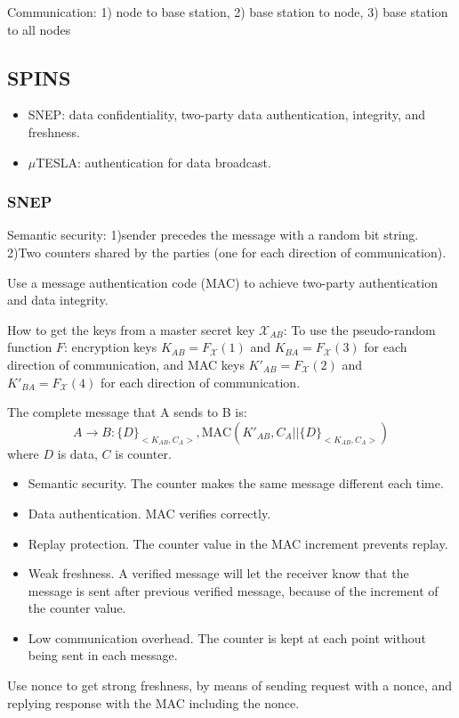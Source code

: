 \documentclass[]{article}
\begin{document}
 Communication: 1) node to base station, 2) base station to node, 3) 
 base station to all nodes
\subsection{SPINS}
\begin{itemize}
 \item SNEP: data confidentiality, two-party data authentication, integrity,
 and freshness.
 \item $\mu$TESLA: authentication for data broadcast.
\end{itemize}

\subsubsection{SNEP}
Semantic security: 1)sender precedes the message with a random bit string.
2)Two counters shared by the parties (one for each direction of
 communication). 
 
 Use a message authentication code (MAC) to achieve two-party authentication
 and data integrity.
 
 How to get the keys from a master secret key $\mathcal{X}_{AB}$: To use
 the pseudo-random function $F$: encryption keys $K_{AB} = F_\mathcal{X}
 (1)$ and $K_{BA} = F_\mathcal{X}(3)$ for each direction of communication, 
 and MAC keys $K'_{AB} = F_\mathcal{X} (2)$ and $K'_{BA} = F_\mathcal{X}
 (4)$ for each direction of communication.
 
 The complete message that A sends to B is:
\begin{equation}
A \rightarrow B: \{D\}_{<K_{AB}, C_A>}, \text{MAC}(K'_{AB},C_A || \{D\}_{<K_{AB},
  C_A>})
\end{equation}
 where $D$ is data, $C$ is counter. 
 \begin{itemize}
  \item Semantic security. The counter makes the same message different 
  each time.
  \item Data authentication. MAC verifies correctly.
  \item Replay protection. The counter value in the MAC increment prevents
   replay.
  \item Weak freshness. A verified message will let the receiver know that
  the message is sent after previous verified message, because of the 
  increment of the counter value.
  \item Low communication overhead. The counter is kept at each point 
  without being sent in each message.
 \end{itemize}
Use nonce to get strong freshness, by means of sending request with a
nonce, and replying response with the MAC including the nonce.
\end{document}
